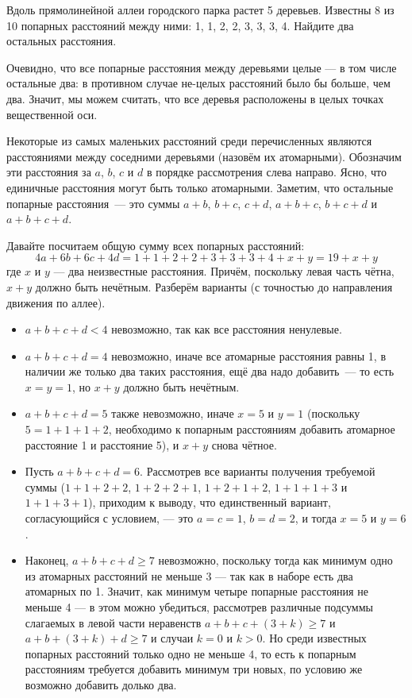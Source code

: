 
\begin{itemize}

\def\met#1{\SI{#1}{\text{м}}}
\itC Вдоль прямолинейной аллеи городского парка растет 5 деревьев. 
Известны 8 из 10 попарных расстояний между ними: 
\met 1, \met 1, \met 2, \met 2, \met 3, \met 3, \met 3, \met 4. 
Найдите два остальных расстояния.

\itr Очевидно, что все попарные расстояния между деревьями целые — 
в том числе остальные два: в противном случае не-целых расстояний 
было бы больше, чем два. Значит, мы можем считать, что все деревья 
расположены в целых точках вещественной оси.

Некоторые из самых маленьких расстояний среди перечисленных являются 
расстояниями между соседними деревьями (назовём их атомарными). 
Обозначим эти расстояния за $a$, $b$, $c$ и $d$ в порядке рассмотрения
слева направо. 
Ясно, что единичные расстояния могут быть только атомарными. 
Заметим, что остальные попарные расстояния~--- это суммы
$a+b$, $b+c$, $c+d$, $a+b+c$, $b+c+d$ и $a+b+c+d$.

Давайте посчитаем общую сумму всех попарных расстояний:
$$4a + 6b + 6c + 4d = 1+1+2+2+3+3+3+4 + x+y = 19+x+y$$
где $x$ и $y$ --- два неизвестные расстояния.
Причём, поскольку левая часть чётна, $x+y$ должно быть нечётным.
Разберём варианты (с точностью до направления движения по аллее).

\begin{itemize}
\item $a+b+c+d < 4$ невозможно, так как все расстояния ненулевые. 
\item $a+b+c+d = 4$ невозможно, иначе все атомарные расстояния равны \met 1, 
в наличии же только два таких расстояния, ещё два надо добавить~--- 
то есть $x=y=1$, но $x+y$ должно быть нечётным.
\item $a+b+c+d = 5$ также невозможно, иначе $x=5$ и $y=1$
(поскольку $5=1+1+1+2$, необходимо к попарным расстояниям добавить 
атомарное расстояние \met 1 и расстояние \met 5), и $x+y$ снова чётное. 
\item Пусть $a+b+c+d = 6$. 
Рассмотрев все варианты получения требуемой суммы ($1+1+2+2$, $1+2+2+1$, 
$1+2+1+2$, $1+1+1+3$ и $1+1+3+1$), приходим к выводу, что единственный
вариант, согласующийся с условием, --- это $a=c=1$, $b=d=2$, и тогда $x=5$ и $y=6$.
\item Наконец, $a+b+c+d \ge 7$ невозможно, поскольку тогда 
как минимум одно из атомарных расстояний не меньше \met 3 --- так как
в наборе есть два атомарных по \met 1. Значит,
как минимум четыре попарные расстояния не меньше \met 4 ---
в этом можно убедиться, рассмотрев различные подсуммы
слагаемых в левой части неравенств $a+b+c+(3+k) \ge 7$ и $a+b+(3+k)+d \ge 7$
и случаи $k = 0$ и $k > 0$.
Но среди известных попарных расстояний только одно не меньше \met 4, 
то есть к попарным расстояниям требуется добавить минимум 
три новых, по условию же возможно добавить долько два.
\end{itemize}


\end{itemize}
